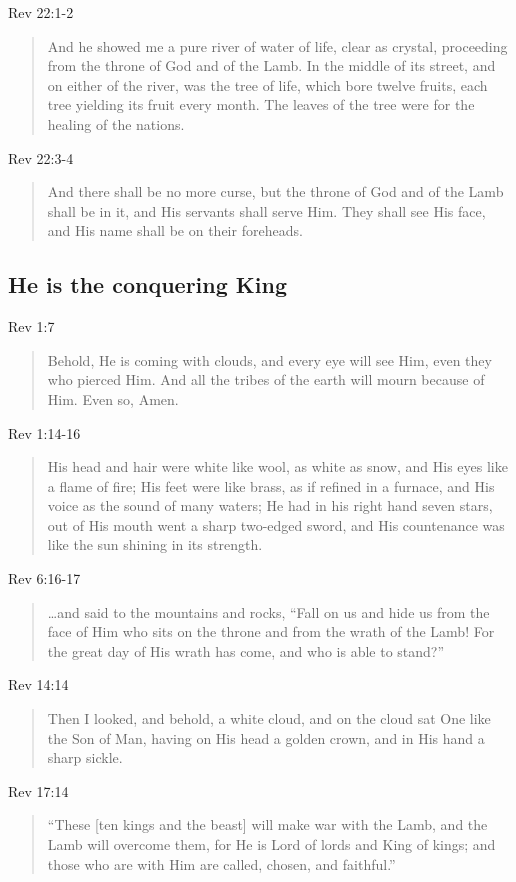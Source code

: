 \documentclass[12pt]{article}
\newcommand{\I}{\item}
\newcommand{\Q}[1]{\begin{quote} #1 \end{quote}}
\begin{document}
\I Rev 22:1-2 \Q{And he showed me a pure river of water of life, 
                clear as crystal, proceeding from the throne of God 
                and of the Lamb. In the middle of its street, and on either
                of the river, was the tree of life, which bore twelve fruits,
                each tree yielding its fruit every month. 
                The leaves of the tree were for the healing of the nations.}
\I Rev 22:3-4 \Q{And there shall be no more curse, but the throne of God
                and of the Lamb shall be in it, and His servants shall 
                serve Him. They shall see His face, and His name shall be on
                their foreheads.}
                    
\subsection{He is the conquering King}
\I Rev 1:7 \Q{Behold, He is coming with clouds, and every eye will see Him, 
                even they who pierced Him. And all the tribes of the earth
                will mourn because of Him. Even so, Amen.}
\I Rev 1:14-16 \Q{His head and hair were white like wool, as white as snow,
                and His eyes like a flame of fire; His feet were like brass, 
                as if refined in a furnace, and His voice as the sound of 
                many waters; He had in his right hand seven stars, 
                out of His mouth went a sharp two-edged sword, 
                and His countenance was like the sun shining in its strength.}
\I Rev 6:16-17 \Q{\ldots and said to the mountains and rocks, 
                ``Fall on us and hide us from the face of Him who sits on the
                throne and from the wrath of the Lamb! For the great day of His
                wrath has come, and who is able to stand?''}
\I Rev 14:14 \Q{Then I looked, and behold, a white cloud, and on the cloud
                sat One like the Son of Man, having on His head a golden crown, 
                and in His hand a sharp sickle.}
\I Rev 17:14 \Q{``These [ten kings and the beast] will make war with the Lamb, 
                and the Lamb will overcome them, for He is Lord of lords and
                King of kings; and those who are with Him are called, 
                chosen, and faithful.''}
\end{document}

